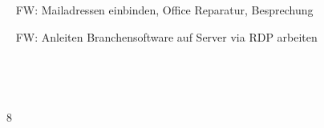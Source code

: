 {{	\textbullet~ FW: Mailadressen einbinden, Office Reparatur, Besprechung\par
	\textbullet~ FW: Anleiten Branchensoftware auf Server via RDP arbeiten\par
	\textbullet~ \par
	\textbullet~ 
	}{}{8}
}{}
\Unterschrift
\newpage
